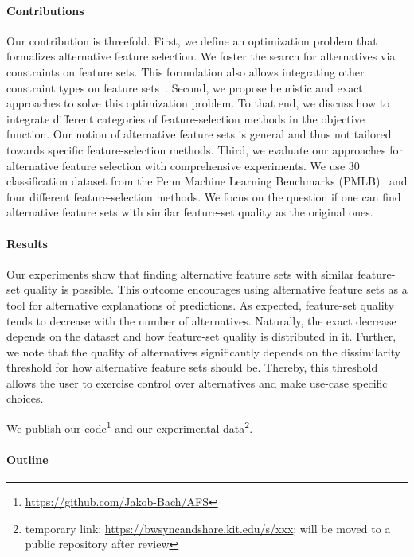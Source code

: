 \documentclass[conference]{IEEEtran}
\theoremstyle{definition}
\begin{document}
\paragraph{Contributions}

Our contribution is threefold.
First, we define an optimization problem that formalizes alternative feature selection.
We foster the search for alternatives via constraints on feature sets.
This formulation also allows integrating other constraint types on feature sets~\cite{paclik2002feature,yuan2006model,groves2015toward}.
Second, we propose heuristic and exact approaches to solve this optimization problem.
To that end, we discuss how to integrate different categories of feature-selection methods in the objective function.
Our notion of alternative feature sets is general and thus not tailored towards specific feature-selection methods.
Third, we evaluate our approaches for alternative feature selection with comprehensive experiments.
We use 30 classification dataset from the Penn Machine Learning Benchmarks (PMLB)~\cite{olson2017pmlb, romano2021pmlb} and four different feature-selection methods.
We focus on the question if one can find alternative feature sets with similar feature-set quality as the original ones.

\paragraph{Results}

Our experiments show that finding alternative feature sets with similar feature-set quality is possible.
This outcome encourages using alternative feature sets as a tool for alternative explanations of predictions.
As expected, feature-set quality tends to decrease with the number of alternatives.
Naturally, the exact decrease depends on the dataset and how feature-set quality is distributed in it.
Further, we note that the quality of alternatives significantly depends on the dissimilarity threshold for how alternative feature sets should be.
Thereby, this threshold allows the user to exercise control over alternatives and make use-case specific choices.

We publish our code\footnote{\url{https://github.com/Jakob-Bach/AFS}} and our experimental data\footnote{temporary link: \url{https://bwsyncandshare.kit.edu/s/xxx}; will be moved to a public repository after review}.

\paragraph{Outline}
\end{document}
